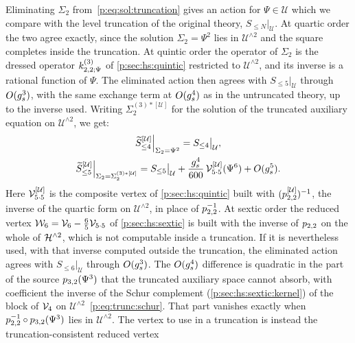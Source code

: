 Eliminating $\Sigma_2$ from~\eqref{p:eq:sol:truncation} gives an action for $\Psi \in \mathcal U$ which we compare with the level truncation of the original theory, $S_{\le N} \big|_{\mathcal U}$.
At quartic order the two agree exactly, since the solution $\Sigma_2 = \Psi^2$ lies in $\mathcal U^{\wedge 2}$ and the square completes inside the truncation.
At quintic order the operator of $\Sigma_2$ is the dressed operator $\kin{2}{\Psi}{3}$ of \cref{p:sec:hs:quintic} restricted to $\mathcal U^{\wedge 2}$, and its inverse is a rational function of $\Psi$.
The eliminated action then agrees with $S_{\le 5} \big|_{\mathcal U}$ through $O(\gs^3)$, with the same exchange term at $O(\gs^4)$ as in the untruncated theory, up to the inverse used.
Writing $\Sigma_2^{(3)*[\mathcal U]}$ for the solution of the truncated auxiliary equation on $\mathcal U^{\wedge 2}$, we get:
\begin{equation}
  \label{p:eq:sol:matching}
  \begin{gathered}
    \caction[\le 4]^{[\mathcal U]} \Big|_{\Sigma_2 = \Psi^2}
      = S_{\le 4} \big|_{\mathcal U},
    \\
    \caction[\le 5]^{[\mathcal U]} \Big|_{\Sigma_2 = \Sigma_2^{(3)*[\mathcal U]}}
      = S_{\le 5} \big|_{\mathcal U}
        + \frac{\gs^4}{600} \, \vertex{5 \cdot 5}^{[\mathcal U]}(\Psi^6)
        + O(\gs^5).
  \end{gathered}
\end{equation}
Here $\vertex{5 \cdot 5}^{[\mathcal U]}$ is the composite vertex of \cref{p:sec:hs:quintic} built with $(\sprod{2}{2}^{[\mathcal U]})^{-1}$, the inverse of the quartic form on $\mathcal U^{\wedge 2}$, in place of $\sprod{2}{2}^{-1}$.
At sextic order the reduced vertex $\dvertex{6} = \vertex{6} - \tfrac{6}{5} \vertex{5 \cdot 5}$ of \cref{p:sec:hs:sextic} is built with the inverse of $\sprod{2}{2}$ on the whole of $\Hn{2}$, which is not computable inside a truncation.
If it is nevertheless used, with that inverse computed outside the truncation, the eliminated action agrees with $S_{\le 6} \big|_{\mathcal U}$ through $O(\gs^3)$.
The $O(\gs^4)$ difference is quadratic in the part of the source $\sprod{3}{2}(\Psi^3)$ that the truncated auxiliary space cannot absorb, with coefficient the inverse of the Schur complement (\cref{p:sec:hs:sextic:kernel}) of the block of $\vertex{4}$ on $\mathcal U^{\wedge 2}$~\eqref{p:eq:trunc:schur}.
That part vanishes exactly when $\sprod{2}{2}^{-1} \circ \sprod{3}{2}(\Psi^3)$ lies in $\mathcal U^{\wedge 2}$.
The vertex to use in a truncation is instead the truncation-consistent reduced vertex
